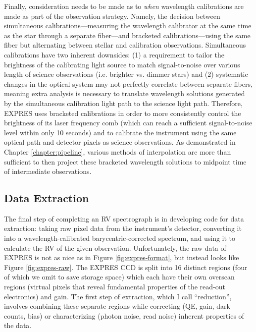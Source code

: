 Finally, consideration needs to be made as to \textit{when} wavelength calibrations are made as part of the observation strategy. Namely, the decision between simultaneous calibrations---measuring the wavelength calibrator at the same time as the star through a separate fiber---and bracketed calibrations---using the same fiber but alternating between stellar and calibration observations. Simultaneous calibrations have two inherent downsides: (1) a requirement to tailor the brightness of the calibrating light source to match signal-to-noise over various length of science observations (i.e. brighter vs. dimmer stars) and (2) systematic changes in the optical system may not perfectly correlate between separate fibers, meaning extra analysis is necessary to translate wavelength solutions generated by the simultaneous calibration light path to the science light path. Therefore, EXPRES uses bracketed calibrations in order to more consistently control the brightness of its laser frequency comb (which can reach a sufficient signal-to-noise level within only 10 seconds) and to calibrate the instrument using the same optical path and detector pixels as science observations. As demonstrated in Chapter \ref{chapter:pipeline}, various methods of interpolation are more than sufficient to then project these bracketed wavelength solutions to midpoint time of intermediate observations.

\subsection{Data Extraction} \label{intro:extraction}

The final step of completing an RV spectrograph is in developing code for data extraction: taking raw pixel data from the instrument's detector, converting it into a wavelength-calibrated barycentric-corrected spectrum, and using it to calculate the RV of the given observation. Unfortunately, the raw data of EXPRES is not as nice as in Figure \ref{fig:expres-format}, but instead looks like Figure \ref{fig:expres-raw}. The EXPRES CCD is split into 16 distinct regions (four of which we omit to save storage space) which each have their own overscan regions (virtual pixels that reveal fundamental properties of the read-out electronics) and gain. The first step of extraction, which I call ``reduction'', involves combining these separate regions while correcting (QE, gain, dark counts, bias) or characterizing (photon noise, read noise) inherent properties of the data.

